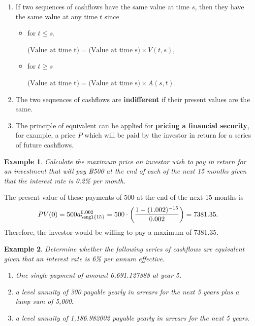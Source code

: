 \documentclass[landscape, 20pt]{extreport}
\theoremstyle{definition}
\theoremstyle{definition}
\newtheorem{example}{Example}[chapter]
\theoremstyle{definition}
\theoremstyle{definition}
\theoremstyle{remark}
\begin{document}
\begin{enumerate}
\def\labelenumi{\arabic{enumi}.}
\item
  If two sequences of cashflows have the same value at time \(s\), then
  they have the same value at any time \(t\) since

  \begin{itemize}
  \item
    for \(t \le s\),

    \(\text{(Value at time t)} = \text{(Value at time s)} \times V(t,s),\)
  \item
    for \(t \ge s\)

    \(\text{(Value at time t)} = \text{(Value at time s)} \times A(s,t).\)
  \end{itemize}
\item
  The two sequences of cashflows are \textbf{indifferent} if their present
  values are the same.
\item
  The principle of equivalent can be applied for \textbf{pricing a financial
  security}, for example, a price \(P\) which will be paid by the
  investor in return for a series of future cashflows.
\end{enumerate}

\newpage \begin{example}
\emph{Calculate the maximum price an investor wish to pay in return for an
investment that will pay ฿500 at the end of each of the next 15 months
given that the interest rate is 0.2\% per month.}
\end{example}

The present value of these payments of 500 at the end of the next 15
months is
\[PV(0) = 500 a^{0.002}_{\angl{15}} =  500 \cdot \left(  \frac{1 - (1.002)^{-15}}{0.002}  \right)   = 7381.35.\]
Therefore, the investor would be willing to pay a maximum of 7381.35.

\newpage \begin{example}

\emph{Determine whether the following series of cashflows are equivalent
given that an interest rate is 6\% per annum effective.}

\begin{enumerate}
\def\labelenumi{\arabic{enumi}.}
\item
  \emph{One single payment of amount 6,691.127888 at year 5.}
\item
  \emph{a level annuity of 300 payable yearly in arrears for the next 5
  years plus a lump sum of 5,000.}
\item
  \emph{a level annuity of 1,186.982002 payable yearly in arrears for the
  next 5 years.}
\end{enumerate}

\end{example}
\end{document}

